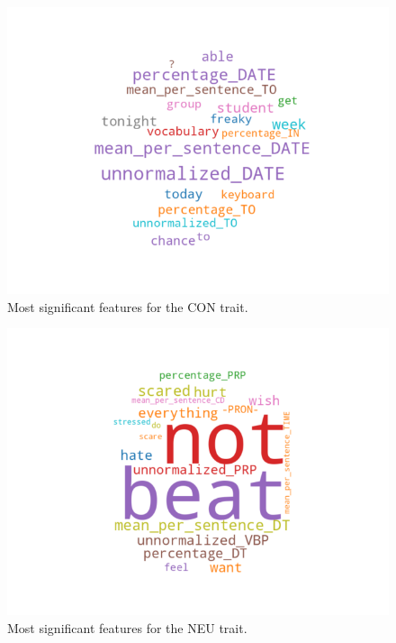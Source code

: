 \documentclass[10pt, a4paper]{article}
\begin{document}
\begin{figure}
\begin{center}
  \includegraphics[width=\columnwidth]{figures/cCON.png}
  \caption{Most significant features for the CON trait.}
  \label{fig:figure4}
\end{center}
\end{figure}

\begin{figure}
\begin{center}
  \includegraphics[width=\columnwidth]{figures/cNEU.png}
  \caption{Most significant features for the NEU trait.}
  \label{fig:figure5}
\end{center}
\end{figure}
\end{document}
